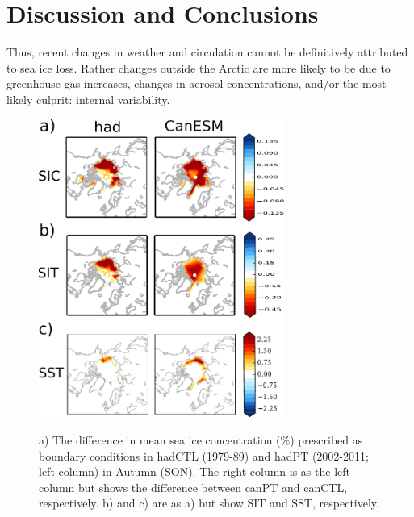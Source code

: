 \documentclass[twocol]{ametsoc}
\begin{document}
\section{Discussion and Conclusions}

Thus, recent changes in weather and circulation cannot be definitively attributed to sea ice loss. Rather changes outside the Arctic are more likely to be due to greenhouse gas increases, changes in aerosol concentrations, and/or the most likely culprit: internal variability.

\begin{figure}[t]
  \noindent\includegraphics[width=19pc,angle=0]{oneseasBCsnonsidc.pdf}\\
  \caption{a) The difference in mean sea ice concentration (\%) prescribed as boundary conditions in hadCTL (1979-89) and hadPT (2002-2011; left column) in Autumn (SON). The right column is as the left column but shows the difference between canPT and canCTL, respectively. b) and c) are as a) but show SIT and SST, respectively.
}\label{fig:fig1}
\end{figure}
\end{document}
